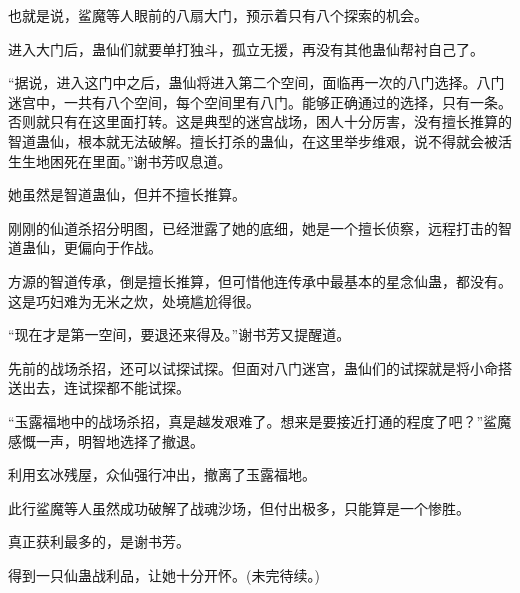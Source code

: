 \begin{this_body}
也就是说，鲨魔等人眼前的八扇大门，预示着只有八个探索的机会。

进入大门后，蛊仙们就要单打独斗，孤立无援，再没有其他蛊仙帮衬自己了。

“据说，进入这门中之后，蛊仙将进入第二个空间，面临再一次的八门选择。八门迷宫中，一共有八个空间，每个空间里有八门。能够正确通过的选择，只有一条。否则就只有在这里面打转。这是典型的迷宫战场，困人十分厉害，没有擅长推算的智道蛊仙，根本就无法破解。擅长打杀的蛊仙，在这里举步维艰，说不得就会被活生生地困死在里面。”谢书芳叹息道。

她虽然是智道蛊仙，但并不擅长推算。

刚刚的仙道杀招分明图，已经泄露了她的底细，她是一个擅长侦察，远程打击的智道蛊仙，更偏向于作战。

方源的智道传承，倒是擅长推算，但可惜他连传承中最基本的星念仙蛊，都没有。这是巧妇难为无米之炊，处境尴尬得很。

“现在才是第一空间，要退还来得及。”谢书芳又提醒道。

先前的战场杀招，还可以试探试探。但面对八门迷宫，蛊仙们的试探就是将小命搭送出去，连试探都不能试探。

“玉露福地中的战场杀招，真是越发艰难了。想来是要接近打通的程度了吧？”鲨魔感慨一声，明智地选择了撤退。

利用玄冰残屋，众仙强行冲出，撤离了玉露福地。

此行鲨魔等人虽然成功破解了战魂沙场，但付出极多，只能算是一个惨胜。

真正获利最多的，是谢书芳。

得到一只仙蛊战利品，让她十分开怀。(未完待续。)

\end{this_body}

